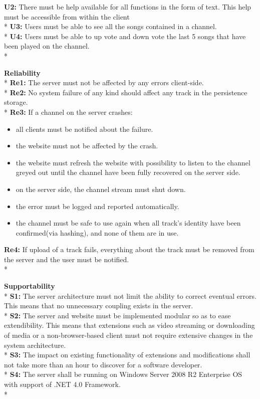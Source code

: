 \documentclass[a4paper,11pt,report]{article}
\begin{document}
\textbf{U2:} There must be help available for all functions in the form of text. This help must be accessible from within the client \\*
\textbf{U3:} Users must be able to see all the songs contained in a channel. \\*
\textbf{U4:} Users must be able to up vote and down vote the last 5 songs that have been played on the channel. \\*

\textbf{Reliability} \\*
\textbf{Re1:} The server must not be affected by any errors client-side. \\*
\textbf{Re2:} No system failure of any kind should affect any track in the persistence storage. \\*
\textbf{Re3:} If a channel on the server crashes:
\begin{itemize}
\item all clients must be notified about the failure.
\item the website must not be affected by the crash.
\item the website must refresh the website with possibility to listen to the channel greyed out until the channel have been fully recovered on the server side.
\item on the server side, the channel stream must shut down.
\item the error must be logged and reported automatically. 
\item the channel must be safe to use again when all track's identity have been confirmed(via hashing), and none of them are in use.
\end{itemize}
\textbf{Re4:} If upload of a track fails, everything about the track must be removed from the server and the user must be notified. \\*

\textbf{Supportability} \\*
\textbf{S1:} The server architecture must not limit the ability to correct eventual errors. This means that no unnecessary coupling exists in the server. \\*
\textbf{S2:} The server and website must be implemented modular so as to ease extendibility. This means that extensions such as video streaming or downloading of media or a non-browser-based client must not require extensive changes in the system architecture.\\*
\textbf{S3:} The impact on existing functionality of extensions and modifications shall not take more than an hour to discover for a software developer. \\*
\textbf{S4:} The server shall be running on Windows Server 2008 R2 Enterprise OS with support of .NET 4.0 Framework.\\*
\end{document}

